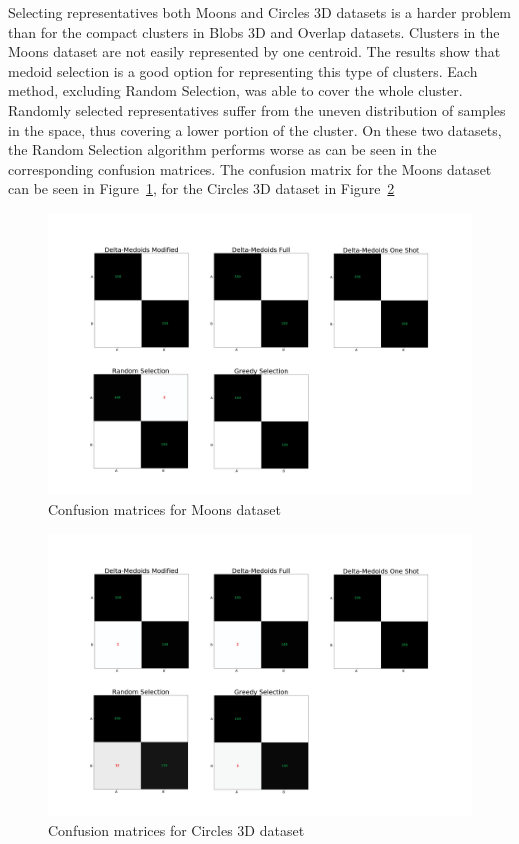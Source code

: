 \documentclass[thesis=B,english]{FITthesis}[2012/10/20]
\begin{document}
\noindent Selecting representatives both Moons and Circles 3D datasets is a harder problem than for the compact clusters in Blobs 3D and Overlap datasets.
Clusters in the Moons dataset are not easily represented by one centroid.
The results show that medoid selection is a good option for representing this type of clusters.
Each method, excluding Random Selection, was able to cover the whole cluster.
Randomly selected representatives suffer from the uneven distribution of samples in the space, thus covering a lower portion of the cluster.
On these two datasets, the Random Selection algorithm performs worse as can be seen in the corresponding confusion matrices.
The confusion matrix for the Moons dataset can be seen in Figure~\ref{img:exp1_moons}, for the Circles 3D dataset in Figure~\ref{img:exp1_circles}

\begin{figure}[h]
   \includegraphics[width=\linewidth]{img/exp1_moons.png}
  \caption{Confusion matrices for Moons dataset}
  \label{img:exp1_moons}
\end{figure}

\begin{figure}[h]
   \includegraphics[width=\linewidth]{img/exp1_circles.png}
  \caption{Confusion matrices for Circles 3D dataset}
  \label{img:exp1_circles}
\end{figure}
\end{document}
